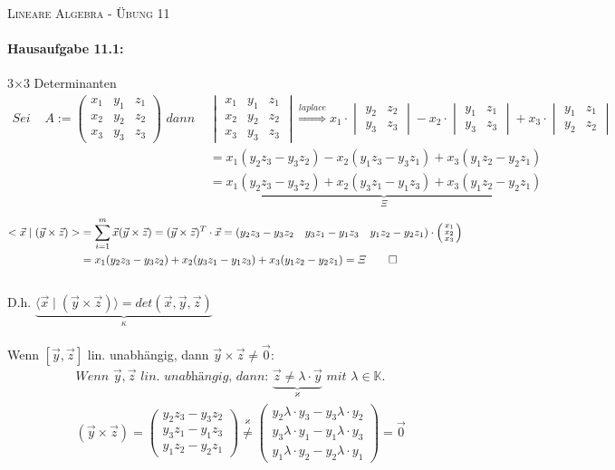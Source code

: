 \documentclass[titlepage]{article}
\newcommand{\K}{\mathbb{K}}
\newcommand{\1}{\mathbb{1}}
\newcommand{\0}{\mathbb{0}}
\newcommand{\vecD}[3]{\left(\begin{smallmatrix}#1\\#2\\#3\end{smallmatrix}\right)}
\newcommand{\detZ}[4]{\begin{vmatrix}#1&#2\\#3&#4\end{vmatrix}}
\newcommand{\detD}[9]{\begin{vmatrix}#1&#2&#3\\#4&#5&#6\\#7&#8&#9\end{vmatrix}}
\newcommand{\matrixD}[9]{\begin{pmatrix}#1&#2&#3\\#4&#5&#6\\#7&#8&#9\end{pmatrix}}
\newcommand{\kreuzproduktD}[6]{\left(\begin{matrix}#2#6-#3#5\\#3#4-#1#6\\#1#5-#2#4\end{matrix}\right)}
\begin{document}
	
	\begin{center}
		\hrulefill\\
		\begin{center}
			\LARGE\textsc{Lineare Algebra - Übung 11} \normalsize\\
		\end{center}
		\hrulefill
		\date{\today}
	\end{center}

	\paragraph{Hausaufgabe 11.1:}3$\times$3 Determinanten
		\begin{align*}
			\textit{Sei }&A:=\matrixD{x_1}{y_1}{z_1}{x_2}{y_2}{z_2}{x_3}{y_3}{z_3}\textit{ dann }&\detD{x_1}{y_1}{z_1}{x_2}{y_2}{z_2}{x_3}{y_3}{z_3}\overset{laplace}{\Rightarrow}x_1\cdot\detZ{y_2}{z_2}{y_3}{z_3}-x_2\cdot\detZ{y_1}{z_1}{y_3}{z_3}+x_3\cdot\detZ{y_1}{z_1}{y_2}{z_2}\\
			&&=x_1(y_2z_3-y_3z_2)-x_2(y_1z_3-y_3z_1)+x_3(y_1z_2-y_2z_1)\\
			&&=\underbrace{x_1(y_2z_3-y_3z_2)+x_2(y_3z_1-y_1z_3)+x_3(y_1z_2-y_2z_1)}_\varXi
		\end{align*}
		\begin{align*}
			<\vec{x}\mid(\vec{y}\times\vec{z})>&=\sum_{i=1}^{m}\vec{x}(\vec{y}\times\vec{z})=(\vec{y}\times\vec{z})^T\cdot\vec{x}=(y_2z_3-y_3z_2\quad y_3z_1-y_1z_3\quad y_1z_2-y_2z_1)\cdot\vecD{x_1}{x_2}{x_3}\\
			&=x_1(y_2z_3-y_3z_2)+x_2(y_3z_1-y_1z_3)+x_3(y_1z_2-y_2z_1)=\varXi\qed
		\end{align*}\\
		D.h. $\underbrace{\langle\vec{x}\mid(\vec{y}\times\vec{z})\rangle=det(\vec{x},\vec{y},\vec{z})}_\kappa$\\\\
		Wenn $[\vec{y},\vec{z}]$ lin. unabhängig, dann $\vec{y}\times\vec{z}\neq\vec{0}$:
		\begin{align*}
			&\textit{Wenn }\vec{y},\vec{z}\textit{ lin. unabhängig, dann: }\underbrace{\vec{z}\neq\lambda\cdot\vec{y}}_\varkappa\textit{ mit }\lambda\in\K.\\
			&(\vec{y}\times\vec{z})=\kreuzproduktD{y_1}{y_2}{y_3}{z_1}{z_2}{z_3}\overset{\varkappa}{\neq}\kreuzproduktD{y_1}{y_2}{y_3}{\lambda\cdot y_1}{\lambda\cdot y_2}{\lambda\cdot y_3}=\vec{0}
		\end{align*}
\end{document}
